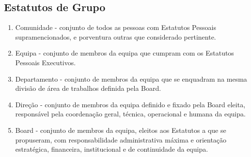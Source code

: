 \subsection{Estatutos de Grupo}
\begin{enumerate}[label=\thesubsection.\arabic*]
  \item Comunidade - conjunto de todos as pessoas com Estatutos Pessoais supramencionados, e porventura outras que considerado pertinente.
  \item Equipa - conjunto de membros da equipa que cumpram com os Estatutos Pessoais Executivos.
  \item Departamento - conjunto de membros da equipa que se enquadram na mesma divisão de área de trabalhos definida pela Board.
  \item Direção - conjunto de membros da equipa definido e fixado pela Board eleita, responsável pela coordenação geral, técnica, operacional e humana da equipa.
  \item Board - conjunto de membros da equipa, eleitos aos Estatutos a que se propuseram, com responsabilidade administrativa máxima e orientação estratégica, financeira, institucional e de continuidade da equipa.
\end{enumerate}

